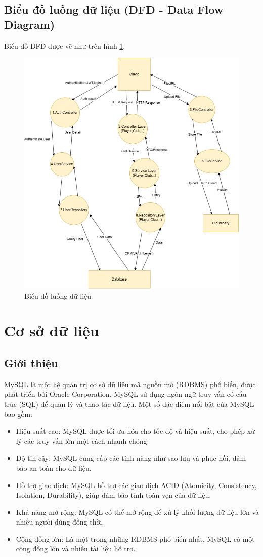 \documentclass[../BTL.tex]{subfiles}
\begin{document}
\subsection{Biểu đồ luồng dữ liệu (DFD - Data Flow Diagram)}
Biểu đồ DFD được vẽ như trên hình
 \ref{fig:DFDV2_LTW}.
\begin{figure}
    \centering
    \includegraphics[width=1\linewidth]{Hinhve/DFDV2_LTW.png}
    \caption{Biểu đồ luồng dữ liệu}
    \label{fig:DFDV2_LTW}
\end{figure}
\section{Cơ sở dữ liệu}
\subsection{Giới thiệu}
MySQL là một hệ quản trị cơ sở dữ liệu mã nguồn mở (RDBMS) phổ biến, được phát triển bởi Oracle Corporation. MySQL sử dụng ngôn ngữ truy vấn có cấu trúc (SQL) để quản lý và thao tác dữ liệu. Một số đặc điểm nổi bật của MySQL bao gồm:

\begin{itemize}
    \item Hiệu suất cao: MySQL được tối ưu hóa cho tốc độ và hiệu suất, cho phép xử lý các truy vấn lớn một cách nhanh chóng.
    \item Độ tin cậy: MySQL cung cấp các tính năng như sao lưu và phục hồi, đảm bảo an toàn cho dữ liệu.
    \item Hỗ trợ giao dịch: MySQL hỗ trợ các giao dịch ACID (Atomicity, Consistency, Isolation, Durability), giúp đảm bảo tính toàn vẹn của dữ liệu.
    \item Khả năng mở rộng: MySQL có thể mở rộng để xử lý khối lượng dữ liệu lớn và nhiều người dùng đồng thời.
    \item Cộng đồng lớn: Là một trong những RDBMS phổ biến nhất, MySQL có một cộng đồng lớn và nhiều tài liệu hỗ trợ.
\end{itemize}
\end{document}
